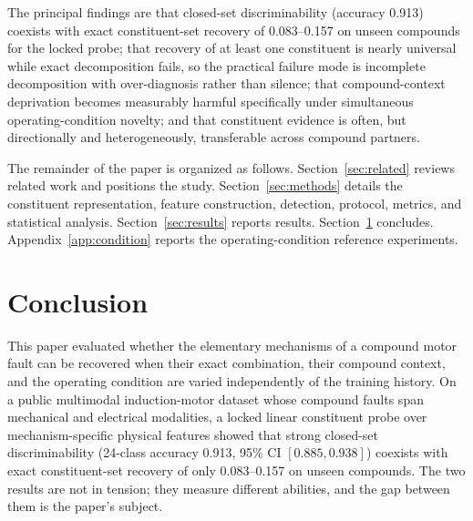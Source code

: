 The principal findings are that closed-set discriminability (accuracy 0.913)
coexists with exact constituent-set recovery of 0.083--0.157 on unseen
compounds for the locked probe; that recovery of at least one constituent is
nearly universal while exact decomposition fails, so the practical failure
mode is incomplete decomposition with over-diagnosis rather than silence;
that compound-context deprivation becomes measurably harmful specifically
under simultaneous operating-condition novelty; and that constituent evidence
is often, but directionally and heterogeneously, transferable across
compound partners.

The remainder of the paper is organized as follows.
Section~\ref{sec:related} reviews related work and positions the study.
Section~\ref{sec:methods} details the constituent representation, feature
construction, detection, protocol, metrics, and statistical analysis.
Section~\ref{sec:results} reports results. Section~\ref{sec:conclusion}
concludes. Appendix~\ref{app:condition} reports the operating-condition
reference experiments.

\section{Conclusion}
\label{sec:conclusion}

This paper evaluated whether the elementary mechanisms of a compound motor
fault can be recovered when their exact combination, their compound context,
and the operating condition are varied independently of the training history.
On a public multimodal induction-motor dataset whose compound faults span
mechanical and electrical modalities, a locked linear constituent probe over
mechanism-specific physical features showed that strong closed-set
discriminability (24-class accuracy 0.913, 95\% CI $[0.885, 0.938]$) coexists
with exact constituent-set recovery of only 0.083--0.157 on unseen compounds.
The two results are not in tension; they measure different abilities, and the
gap between them is the paper's subject.

